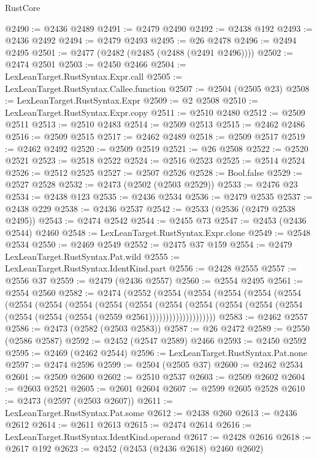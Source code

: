 \begin{lexlean}{RustCore}
\begin{coremodule}
@2490 := @2436 @2489
@2491 := @2479 @2490
@2492 := @2438 @192
@2493 := @2436 @2492
@2494 := @2479 @2493
@2495 := @26 @2478
@2496 := @2494 @2495
@2501 := @2477 (@2482 (@2485 (@2488 (@2491 @2496))))
@2502 := @2474 @2501
@2503 := @2450 @2466
@2504 := LexLeanTarget.RustSyntax.Expr.call
@2505 := LexLeanTarget.RustSyntax.Callee.function
@2507 := @2504 (@2505 @23)
@2508 := LexLeanTarget.RustSyntax.Expr
@2509 := @2 @2508
@2510 := LexLeanTarget.RustSyntax.Expr.copy
@2511 := @2510 @2480
@2512 := @2509 @2511
@2513 := @2510 @2483
@2514 := @2509 @2513
@2515 := @2462 @2486
@2516 := @2509 @2515
@2517 := @2462 @2489
@2518 := @2509 @2517
@2519 := @2462 @2492
@2520 := @2509 @2519
@2521 := @26 @2508
@2522 := @2520 @2521
@2523 := @2518 @2522
@2524 := @2516 @2523
@2525 := @2514 @2524
@2526 := @2512 @2525
@2527 := @2507 @2526
@2528 := Bool.false
@2529 := @2527 @2528
@2532 := @2473 (@2502 (@2503 @2529))
@2533 := @2476 @23
@2534 := @2438 @123
@2535 := @2436 @2534
@2536 := @2479 @2535
@2537 := @2438 @229
@2538 := @2436 @2537
@2542 := @2533 (@2536 (@2479 @2538 @2495))
@2543 := @2474 @2542
@2544 := @2455 @73
@2547 := @2453 (@2436 @2544) @2460
@2548 := LexLeanTarget.RustSyntax.Expr.clone
@2549 := @2548 @2534
@2550 := @2469 @2549
@2552 := @2475 @37 @159
@2554 := @2479 LexLeanTarget.RustSyntax.Pat.wild
@2555 := LexLeanTarget.RustSyntax.IdentKind.part
@2556 := @2428 @2555
@2557 := @2556 @37
@2559 := @2479 (@2436 @2557)
@2560 := @2554 @2495
@2561 := @2554 @2560
@2582 := @2474
    (@2552
      (@2554
        (@2554
          (@2554
            (@2554
              (@2554
                (@2554
                  (@2554
                    (@2554
                      (@2554
                        (@2554
                          (@2554
                            (@2554
                              (@2554
                                (@2554 (@2554 (@2554 (@2554 (@2554 (@2559 @2561))))))))))))))))))))
@2583 := @2462 @2557
@2586 := @2473 (@2582 (@2503 @2583))
@2587 := @26 @2472
@2589 := @2550 (@2586 @2587)
@2592 := @2452 (@2547 @2589) @2466
@2593 := @2450 @2592
@2595 := @2469 (@2462 @2544)
@2596 := LexLeanTarget.RustSyntax.Pat.none
@2597 := @2474 @2596
@2599 := @2504 (@2505 @37)
@2600 := @2462 @2534
@2601 := @2509 @2600
@2602 := @2510 @2537
@2603 := @2509 @2602
@2604 := @2603 @2521
@2605 := @2601 @2604
@2607 := @2599 @2605 @2528
@2610 := @2473 (@2597 (@2503 @2607))
@2611 := LexLeanTarget.RustSyntax.Pat.some
@2612 := @2438 @260
@2613 := @2436 @2612
@2614 := @2611 @2613
@2615 := @2474 @2614
@2616 := LexLeanTarget.RustSyntax.IdentKind.operand
@2617 := @2428 @2616
@2618 := @2617 @192
@2623 := @2452 (@2453 (@2436 @2618) @2460 @2602)

\end{coremodule}
\end{lexlean}
